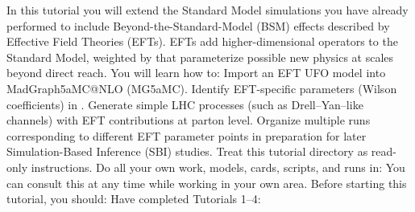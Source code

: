 \markdownRendererDocumentBegin
\markdownRendererSectionBegin
{}\markdownRendererInterblockSeparator
{}In this tutorial you will extend the Standard Model simulations you have already performed to include Beyond-the-Standard-Model (BSM) effects described by Effective Field Theories (EFTs). EFTs add higher-dimensional operators to the Standard Model, weighted by  that parameterize possible new physics at scales beyond direct reach.\markdownRendererParagraphSeparator
{}You will learn how to:\markdownRendererInterblockSeparator
{}\markdownRendererUlBeginTight
\markdownRendererUlItem Import an EFT UFO model into MadGraph5\markdownRendererUnderscore{}aMC@NLO (MG5\markdownRendererUnderscore{}aMC).\markdownRendererUlItemEnd 
\markdownRendererUlItem Identify EFT-specific parameters (Wilson coefficients) in .\markdownRendererUlItemEnd 
\markdownRendererUlItem Generate simple LHC processes (such as Drell–Yan–like channels) with EFT contributions at parton level.\markdownRendererUlItemEnd 
\markdownRendererUlItem Organize multiple runs corresponding to different EFT parameter points in preparation for later Simulation-Based Inference (SBI) studies.\markdownRendererUlItemEnd 
\markdownRendererUlEndTight \markdownRendererInterblockSeparator
{}\markdownRendererBlockQuoteBegin
{} Treat this tutorial directory as read-only instructions. Do all your own work, models, cards, scripts, and runs in:\markdownRendererInterblockSeparator
{}\markdownRendererUlBeginTight
\markdownRendererUlItem {}\markdownRendererUlItemEnd 
\markdownRendererUlEndTight \markdownRendererBlockQuoteEnd \markdownRendererInterblockSeparator
{}You can consult this  at any time while working in your own area.\markdownRendererInterblockSeparator
{}\markdownRendererThematicBreak{}\markdownRendererInterblockSeparator
{}\markdownRendererSectionBegin
{}\markdownRendererInterblockSeparator
{}Before starting this tutorial, you should:\markdownRendererInterblockSeparator
{}\markdownRendererUlBeginTight
\markdownRendererUlItem Have completed Tutorials 1–4:\markdownRendererInterblockSeparator
{}\markdownRendererUlBeginTight
